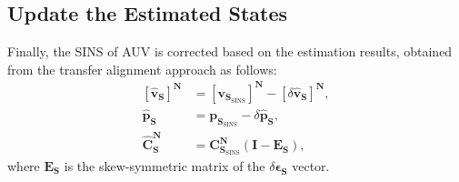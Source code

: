\documentclass[3p]{elsarticle}
\begin{document}
\subsection{Update the Estimated States}
\noindent Finally, the SINS of AUV is corrected based on the estimation results, obtained from the transfer alignment approach as follows:
\begin{align}
	{\left[\hat{\mathbf{v}}_{\mathbf{S}}\right]}^{\mathbf{N}} &= {\left[{\mathbf{v}}_{\mathbf{S}_{\text{SINS}}}
	\right]}^{\mathbf{N}} - {\left[\delta\hat{\mathbf{v}}_{\mathbf{S}}\right]}^{\mathbf{N}},\\
	\hat{\mathbf{p}}_{\mathbf{S}} &= {\mathbf{p}}_{\mathbf{S}_{\text{SINS}}} - \delta\hat{\mathbf{p}}_{\mathbf{S}},
	\\
	\hat{\mathbf{C}}_{\mathbf{S}}^{\mathbf{N}} &= \mathbf{C}_{\mathbf{S}_{\text{SINS}}}^{\mathbf{N}}(\mathbf{I}-\mathbf{E}_{\mathbf{S}}),
\end{align}
where \(\mathbf{E}_{\mathbf{S}}\) is the skew-symmetric matrix of the \(\delta \boldsymbol{\epsilon}_{\mathbf{S}}\) vector.











%

\end{document}
